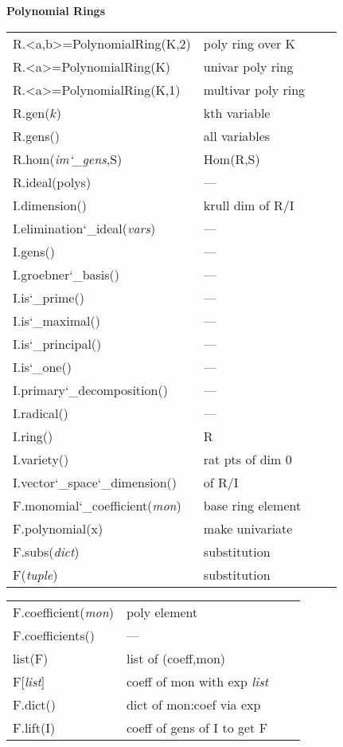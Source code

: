 \documentclass{amsart}
\newcommand{\Section}[1]{\filbreak\par\vspace{5pt}\noindent\textbf{#1}\par\noindent\ignorespaces}
\newcommand{\us}{\char`\_}  %
\begin{document}
\begin{multicols}{3}
\Section{Polynomial Rings}
\noindent
\begin{tabular}{@{\ttfamily\enspace}ll@{\ttfamily\enspace}ll}
R.<a,b>=PolynomialRing(K,2) & poly ring over K\\
R.<a>=PolynomialRing(K) & univar poly ring\\
R.<a>=PolynomialRing(K,1) & multivar poly ring\\
R.gen($k$) & kth variable\\
R.gens() & all variables\\
R.hom(\textit{im\us gens},S) & Hom(R,S)\\
R.ideal(polys) & ---\\
I.dimension() & krull dim of R/I\\
I.elimination\us ideal(\textit{vars}) & ---\\
I.gens() & ---\\
I.groebner\us basis() & ---\\
I.is\us prime() & ---\\
I.is\us maximal() & ---\\
I.is\us principal() & ---\\
I.is\us one() & ---\\
I.primary\us decomposition() & ---\\
I.radical() & ---\\
I.ring() & R\\
I.variety() & rat pts of dim 0 \\
I.vector\us space\us dimension() & of R/I\\
F.monomial\us coefficient(\textit{mon}) & base ring element\\
F.polynomial(x) & make univariate\\
F.subs(\textit{dict}) & substitution\\
F(\textit{tuple}) & substitution\\
\end{tabular}
\begin{tabular}{@{\ttfamily\enspace}ll@{\ttfamily\enspace}ll}
F.coefficient(\textit{mon}) & poly element\\
F.coefficients() & ---\\
list(F) & list of (coeff,mon)\\
F[\textit{list}] & coeff of mon with exp \textit{list}\\
F.dict() & dict of mon:coef via exp\\
F.lift(I) & coeff of gens of I to get F
\end{tabular}


\end{multicols}
\end{document}

